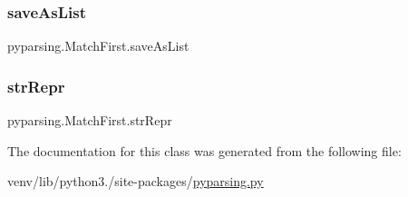 \subsubsection{\texorpdfstring{save\+As\+List}{saveAsList}}
{\footnotesize\ttfamily pyparsing.\+Match\+First.\+save\+As\+List}

\mbox{\label{classpyparsing_1_1MatchFirst_ae529d692983ab536ff066185cb864fa1}} 
\subsubsection{\texorpdfstring{str\+Repr}{strRepr}}
{\footnotesize\ttfamily pyparsing.\+Match\+First.\+str\+Repr}



The documentation for this class was generated from the following file\+:\begin{DoxyCompactItemize}
\item 
venv/lib/python3./site-\/packages/\hyperlink{pyparsing_8py}{pyparsing.\+py}\end{DoxyCompactItemize}
